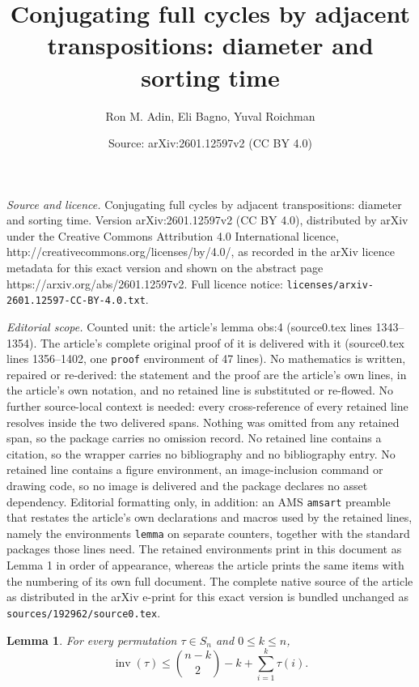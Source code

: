\documentclass[10pt,a4paper]{amsart}
\title{Conjugating full cycles by adjacent transpositions: diameter and sorting time}
\author{Ron M. Adin, Eli Bagno, Yuval Roichman}
\date{Source: arXiv:2601.12597v2 (CC BY 4.0)}
\newtheorem{lemma}{Lemma}
\newcommand{\inv}{{\operatorname{inv}}}
\begin{document}
\maketitle

\noindent\emph{Source and licence.} Conjugating full cycles by adjacent transpositions: diameter and sorting time. Version arXiv:2601.12597v2 (CC BY 4.0), distributed by arXiv under the Creative Commons Attribution 4.0 International licence, http://creativecommons.org/licenses/by/4.0/, as recorded in the arXiv licence metadata for this exact version and shown on the abstract page https://arxiv.org/abs/2601.12597v2. Full licence notice: \texttt{licenses/arxiv-2601.12597-CC-BY-4.0.txt}.\par\smallskip

\noindent\textit{Editorial scope.} Counted unit: the article's lemma obs:4 (source0.tex lines 1343--1354). The article's complete original proof of it is delivered with it (source0.tex lines 1356--1402, one \texttt{proof} environment of 47 lines). No mathematics is written, repaired or re-derived: the statement and the proof are the article's own lines, in the article's own notation, and no retained line is substituted or re-flowed.  No further source-local context is needed: every cross-reference of every retained line resolves inside the two delivered spans.  Nothing was omitted from any retained span, so the package carries no omission record.  No retained line contains a citation, so the wrapper carries no bibliography and no bibliography entry.  No retained line contains a figure environment, an image-inclusion command or drawing code, so no image is delivered and the package declares no asset dependency.  Editorial formatting only, in addition: an AMS \texttt{amsart} preamble that restates the article's own declarations and macros used by the retained lines, namely the environments \texttt{lemma} on separate counters, together with the standard packages those lines need.  The retained environments print in this document as Lemma 1 in order of appearance, whereas the article prints the same items with the numbering of its own full document.  The complete native source of the article as distributed in the arXiv e-print for this exact version is bundled unchanged as \texttt{sources/192962/source0.tex}.
\begin{lemma}\label{obs:4}
For every permutation $\tau\in S_n$ and $0\le k\le n$, 
\[
    \inv(\tau)
    \le \binom{n-k}{2}-k + \sum_{i=1}^k \tau(i).  
\]
\end{lemma}
\end{document}

